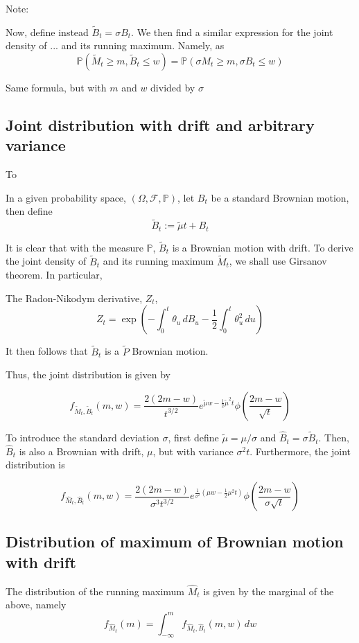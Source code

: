 \documentclass[../Thesis.tex]{subfiles}
\begin{document}
Note:

Now, define instead $\tilde{B}_t = \sigma B_t$. We then find a similar expression for the joint density of ... and its running maximum. Namely, as
$$\mathbb{P}\left(\tilde{M}_t \geq m, \tilde{B}_t \leq w\right) = \mathbb{P}\left(\sigma M_t \geq m, \sigma B_t \leq w\right)$$

Same formula, but with $m$ and $w$ divided by $\sigma$



\subsection{Joint distribution with drift and arbitrary variance}
To

In a given probability space, $(\Omega, \mathcal{F}, \mathbb{P})$, let $B_t$ be a standard Brownian motion, then define
$$\tilde{B}_t := \tilde{\mu} t + B_t$$

It is clear that with the measure $\mathbb{P}$, $\tilde{B}_t$ is a Brownian motion with drift. To derive the joint density of $\tilde{B}_t$ and its running maximum $\tilde{M}_t$, we shall use Girsanov theorem. In particular,


The Radon-Nikodym derivative, $Z_t$,
$$Z_t = \exp \left( - \int_0^t \theta_u \, dB_u - \frac{1}{2} \int_0^t \theta_u^2 \, du\right)$$



It then follows that $\tilde{B}_t$ is a $\tilde{P}$ Brownian motion.


Thus, the joint distribution is given by

$$f_{\tilde{M}_t, \tilde{B}_t}(m,w) = \frac{2(2m-w)}{t^{3/2}} e^{\tilde{\mu} w - \frac{1}{2}\tilde{\mu}^2 t} \phi\left(\frac{2m-w}{\sqrt{t}}\right)$$


To introduce the standard deviation $\sigma$, first define $\tilde{\mu} = \mu / \sigma$ and $\hat{B}_t = \sigma \tilde{B}_t$. Then, $\hat{B}_t$ is also a Brownian with drift, $\mu$, but with variance $\sigma^2 t$. Furthermore, the joint distribution is

$$f_{\hat{M}_t, \hat{B}_t}(m,w) = \frac{2(2m-w)}{\sigma^3 t^{3/2}} e^{\frac{1}{\sigma^2}\left(\mu w - \frac{1}{2}\mu^2 t\right)} \phi\left(\frac{2m-w}{\sigma \sqrt{t}}\right)$$



\subsection{Distribution of maximum of Brownian motion with drift}
The distribution of the running maximum $\hat{M}_t$ is given by the marginal of the above, namely
$$f_{\hat{M}_t} (m) = \int_{-\infty}^m f_{\hat{M}_t, \hat{B}_t} (m,w)\, dw$$
\end{document}
